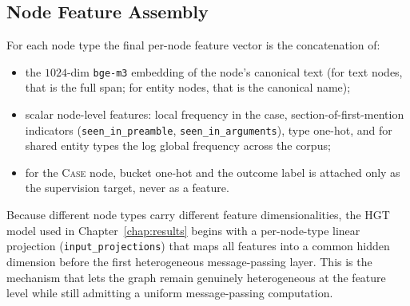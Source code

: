 \subsection{Node Feature Assembly}

For each node type the final per-node feature vector is the
concatenation of:

\begin{itemize}
  \item the $1024$-dim \texttt{bge-m3} embedding of the node's canonical
    text (for text nodes, that is the full span; for entity nodes,
    that is the canonical name);
  \item scalar node-level features: local frequency in the case,
    section-of-first-mention indicators (\texttt{seen\_in\_preamble},
    \texttt{seen_in\_arguments}), type one-hot, and for shared entity
    types the log global frequency across the corpus;
  \item for the \textsc{Case} node, bucket one-hot and the outcome
    label is attached only as the supervision target, never as a
    feature.
\end{itemize}

Because different node types carry different feature dimensionalities,
the HGT model used in Chapter~\ref{chap:results} begins with a
per-node-type linear projection (\texttt{input\_projections}) that maps
all features into a common hidden dimension before the first
heterogeneous message-passing layer. This is the mechanism that lets
the graph remain genuinely heterogeneous at the feature level while
still admitting a uniform message-passing computation.
